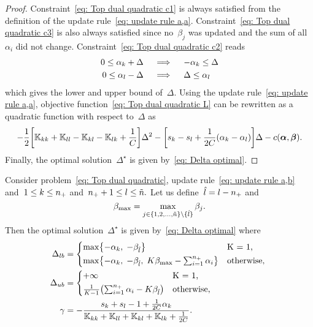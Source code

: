 \begin{proof}
  Constraint~\eqref{eq: Top dual quadratic c1} is always satisfied from the definition of the update rule~\eqref{eq: update rule a,a}. Constraint~\eqref{eq: Top dual quadratic c3} is also always satisfied since no~$\beta_j$ was updated and the sum of all~$\alpha_i$ did not change. Constraint~\eqref{eq: Top dual quadratic c2} reads
  \begin{align*}
    0 \leq \alpha_k + \Delta
    & \quad \implies \quad
    - \alpha_k \leq \Delta \\
    0 \leq \alpha_l - \Delta
    & \quad \implies \quad
    \Delta \leq \alpha_l
  \end{align*}
  which gives the lower and upper bound of~$\Delta.$ Using the update rule~\eqref{eq: update rule a,a}, objective function~\eqref{eq: Top dual quadratic L} can be rewritten as a quadratic function with respect to~$\Delta$ as
  \begin{equation*}
    - \frac{1}{2} \Brac[s]{\K_{kk} + \K_{ll} - \K_{kl} - \K_{lk} + \frac{1}{C}} \Delta^2
    - \Brac[s]{s_k - s_l + \frac{1}{2C}(\alphak - \alphal)} \Delta
    - c(\bm{\alpha}, \bm{\beta}).
  \end{equation*}
  Finally, the optimal solution~$\Delta^{\star}$ is given by~\eqref{eq: Delta optimal}.
\end{proof}

\begin{lemma}\label{thm: toppushk family quadratic update a,b}
  Consider problem~\eqref{eq: Top dual quadratic}, update rule~\eqref{eq: update rule a,b} and~$1 \leq k \leq n_{+}$ and~$n_{+} + 1 \leq l \leq \tilde{n}.$ Let us define~$\hat{l} = l - n_{+}$ and
  \begin{equation*}
    \beta_{\max} = \max_{j \in \{1, 2, \ldots, \tilde{n} \} \setminus \{\hat{l}\}} \beta_j.
  \end{equation*}
  Then the optimal solution~$\Delta^{\star}$ is given by~\eqref{eq: Delta optimal} where
  \begin{align*}
    \Delta_{lb} & = 
      \begin{cases*}
        \max \Brac[c]{- \alphak,\;  -\betal} & K = 1, \\
        \max \Brac[c]{- \alphak,\;  -\betal, \; K\beta_{\max} - \sum_{i = 1}^{\npos} \alpha_i} & \textrm{otherwise},
      \end{cases*} \\
    \Delta_{ub} & = 
      \begin{cases*}
        + \infty & K = 1, \\
        \frac{1}{K-1}\Brac{\sum_{i = 1}^{\npos} \alpha_i - K \betal} & \textrm{otherwise},
      \end{cases*} \\
    \gamma & = -\frac{s_k + s_l - 1 + \frac{1}{2C} \alphak}{\K_{kk} + \K_{ll} + \K_{kl} + \K_{lk} + \frac{1}{2C}}.
  \end{align*}
\end{lemma}

